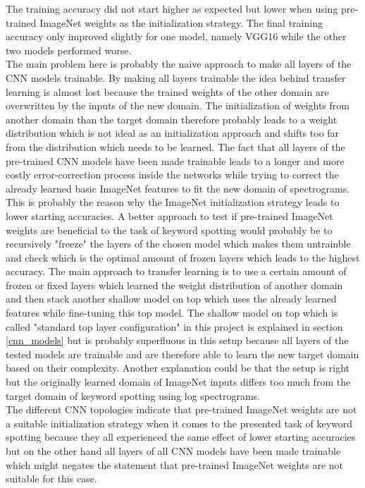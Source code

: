 \documentclass{article}
\theoremstyle{definition}
\theoremstyle{remark}
\begin{document}
The training accuracy did not start higher as expected but lower when using pre-trained ImageNet weights as the initialization strategy. The final training accuracy only improved slightly for one model, namely VGG16 while the other two models performed worse.\\
The main problem here is probably the naive approach to make all layers of the CNN models trainable. By making all layers trainable the idea behind transfer learning is almost lost because the trained weights of the other domain are overwritten by the inputs of the new domain. The initialization of weights from another domain than the target domain therefore probably leads to a weight distribution which is not ideal as an initialization approach and shifts too far from the distribution which needs to be learned.
The fact that all layers of the pre-trained CNN models have been made trainable leads to a longer and more costly error-correction process inside the networks while trying to correct the already learned basic ImageNet features to fit the new domain of spectrograms. This is probably the reason why the ImageNet initialization strategy leads to lower starting accuracies. A better approach to test if pre-trained ImageNet weights are beneficial to the task of keyword spotting would probably be to recursively "freeze" the layers of the chosen model which makes them untrainble and check which is the optimal amount of frozen layers which leads to the highest accuracy. The main approach to transfer learning is to use a certain amount of frozen or fixed layers which learned the weight distribution of another domain and then stack another shallow model on top which uses the already learned features while fine-tuning this top model. The shallow model on top which is called "standard top layer configuration" in this project is explained in section \ref{cnn_models} but is probably superfluous in this setup because all layers of the tested models are trainable and are therefore able to learn the new target domain based on their complexity. Another explanation could be that the setup is right but the originally learned domain of ImageNet inputs differs too much from the target domain of keyword spotting using log spectrograms.\\
The different CNN topologies indicate that pre-trained ImageNet weights are not a suitable initialization strategy when it comes to the presented task of keyword spotting because they all experienced the same effect of lower starting accuracies but on the other hand all layers of all CNN models have been made trainable which might negates the statement that pre-trained ImageNet weights are not suitable for this case.\\
\end{document}

